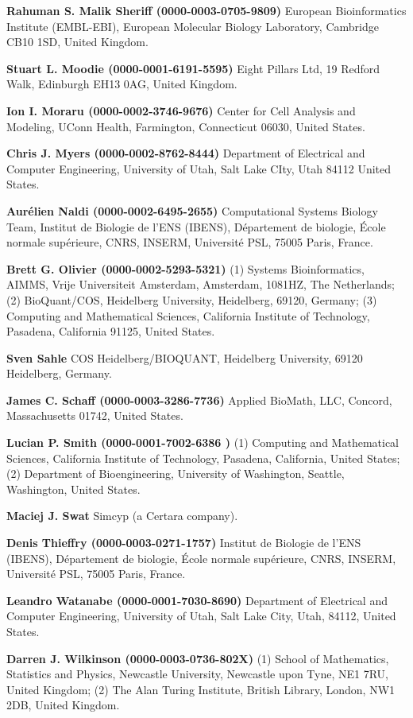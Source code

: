 \documentclass{sbml-paper}
\begin{document}
\textbf{Rahuman S. Malik Sheriff (0000-0003-0705-9809)} European Bioinformatics Institute (EMBL-EBI), European Molecular Biology Laboratory, Cambridge CB10 1SD, United Kingdom.

\textbf{Stuart L. Moodie (0000-0001-6191-5595)} Eight Pillars Ltd, 19 Redford Walk, Edinburgh EH13 0AG, United Kingdom.

\textbf{Ion I. Moraru (0000-0002-3746-9676)} Center for Cell Analysis and Modeling, UConn Health, Farmington, Connecticut 06030, United States.

\textbf{Chris J. Myers (0000-0002-8762-8444)} Department of Electrical and Computer Engineering, University of Utah, Salt Lake CIty, Utah 84112 United States.

\textbf{Aurélien Naldi (0000-0002-6495-2655)} Computational Systems Biology Team, Institut de Biologie de l’ENS (IBENS), Département de biologie, École normale supérieure, CNRS, INSERM, Université PSL, 75005 Paris, France.

\textbf{Brett G. Olivier (0000-0002-5293-5321)} (1) Systems Bioinformatics, AIMMS, Vrije Universiteit Amsterdam, Amsterdam, 1081HZ, The Netherlands; (2) BioQuant/COS, Heidelberg University, Heidelberg, 69120, Germany; (3) Computing and Mathematical Sciences, California Institute of Technology, Pasadena, California 91125, United States.

\textbf{Sven Sahle} COS Heidelberg/BIOQUANT,  Heidelberg University, 69120 Heidelberg, Germany.

\textbf{James C. Schaff (0000-0003-3286-7736)} Applied BioMath, LLC, Concord, Massachusetts 01742, United States.

\textbf{Lucian P. Smith (0000-0001-7002-6386 )} (1) Computing and Mathematical Sciences, California Institute of Technology, Pasadena, California, United States; (2) Department of Bioengineering, University of Washington, Seattle, Washington, United States.

\textbf{Maciej J. Swat} Simcyp (a Certara company).

\textbf{Denis Thieffry (0000-0003-0271-1757)} Institut de Biologie de l'ENS (IBENS), Département de biologie, École normale supérieure, CNRS, INSERM, Université PSL, 75005 Paris, France.

\textbf{Leandro Watanabe (0000-0001-7030-8690)} Department of Electrical and Computer Engineering,  University of Utah, Salt Lake City, Utah, 84112, United States.

\textbf{Darren J. Wilkinson (0000-0003-0736-802X)} (1) School of Mathematics, Statistics and Physics, Newcastle University, Newcastle upon Tyne, NE1 7RU, United Kingdom; (2) The Alan Turing Institute, British Library, London, NW1 2DB, United Kingdom.
\end{document}
